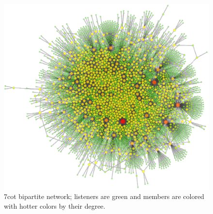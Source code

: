\begin{figure}
\includegraphics[width=\textwidth]{bpn.pdf}
\caption{7cot bipartite network; listeners are green and members are colored with 
hotter colors by their degree.}
\label{fig:bpn}
\end{figure}

